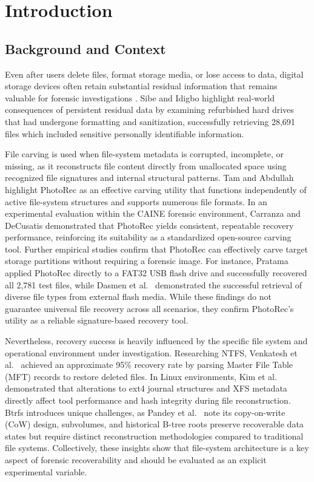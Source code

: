 \documentclass[conference]{IEEEtran}
\begin{document}
\section{Introduction}

\subsection{Background and Context}

Even after users delete files, format storage media, or lose access to data, digital storage devices often retain substantial residual information that remains valuable for forensic investigations \cite{liambas2024performance}. Sibe and Idigbo \cite{sibe2025pii} highlight real-world consequences of persistent residual data by examining refurbished hard drives that had undergone formatting and sanitization, successfully retrieving 28,691 files which included sensitive personally identifiable information.

File carving is used when file-system metadata is corrupted, incomplete, or missing, as it reconstructs file content directly from unallocated space using recognized file signatures and internal structural patterns. Tam and Abdullah \cite{tam2024androidjpeg} highlight PhotoRec as an effective carving utility that functions independently of active file-system structures and supports numerous file formats. In an experimental evaluation within the CAINE forensic environment, Carranza and DeCusatis \cite{carranza2021daubert} demonstrated that PhotoRec yields consistent, repeatable recovery performance, reinforcing its suitability as a standardized open-source carving tool. Further empirical studies confirm that PhotoRec can effectively carve target storage partitions without requiring a forensic image. For instance, Pratama \cite{pratama2021photorec} applied PhotoRec directly to a FAT32 USB flash drive and successfully recovered all 2,781 test files, while Dasmen et al.\ \cite{dasmen2024photorec} demonstrated the successful retrieval of diverse file types from external flash media. While these findings do not guarantee universal file recovery across all scenarios, they confirm PhotoRec's utility as a reliable signature-based recovery tool.

Nevertheless, recovery success is heavily influenced by the specific file system and operational environment under investigation. Researching NTFS, Venkatesh et al.\ \cite{venkatesh2024ntfs} achieved an approximate 95\% recovery rate by parsing Master File Table (MFT) records to restore deleted files. In Linux environments, Kim et al.\ \cite{kim2021ext4xfs} demonstrated that alterations to ext4 journal structures and XFS metadata directly affect tool performance and hash integrity during file reconstruction. Btrfs introduces unique challenges, as Pandey et al.\ \cite{pandey2026btrfs} note its copy-on-write (CoW) design, subvolumes, and historical B-tree roots preserve recoverable data states but require distinct reconstruction methodologies compared to traditional file systems. Collectively, these insights show that file-system architecture is a key aspect of forensic recoverability and should be evaluated as an explicit experimental variable.
\end{document}
